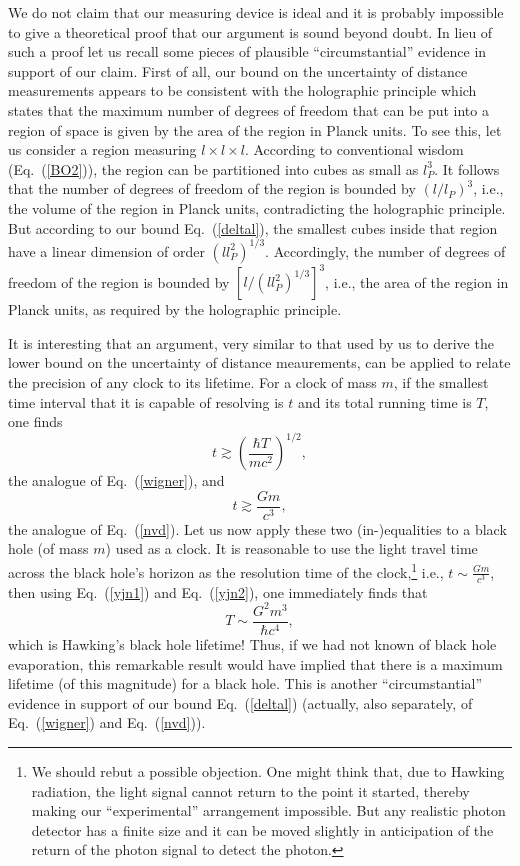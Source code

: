 \documentclass[preprint2]{aastex}
\begin{document}
We do not claim that our measuring device is ideal and it is probably
impossible to give a theoretical proof that our argument is sound beyond
doubt.  In lieu of such a proof let us recall some pieces of
plausible ``circumstantial'' evidence in support of our claim.
First of all, our bound on the
uncertainty of distance measurements appears to be
consistent\citep{ngy00a,ngy00b,ngy01} with the
holographic principle\citep{tho93,sus95} which states that the maximum
number of degrees of freedom that can be put into a region of space is
given by the area of the region in Planck units.  To see this, let us
consider a region measuring $l \times l \times l$.  According
to conventional wisdom (Eq.~(\ref{BO2})), the
region can be partitioned into cubes as small
as $l_P^3$.  It follows that the number of degrees of freedom of the region
is bounded by $(l/l_P)^3$, i.e., the volume of the region in Planck units,
contradicting the holographic principle.  But according to our bound
Eq.~(\ref{deltal}), the smallest cubes inside that region have a linear
dimension of order $(l l_P^2)^{1/3}$.  Accordingly, the number of
degrees of freedom of the region is bounded by $[l/(l l_P^2)^{1/3}]^3$,
i.e., the area of the region in Planck units, as required by the
holographic principle.

It is interesting that an argument, very similar to that used by us to
derive the lower bound on the uncertainty of distance meaurements, can be
applied to relate the precision of any clock to its
lifetime. \citep{ngy01,ngy02}  For a clock
of mass $m$, if the smallest time
interval that it is capable of resolving is $t$ and its total running
time is $T$, one finds
\begin{equation}
t \gtrsim \left(\frac{\hbar T}{mc^2}\right)^{1/2},
\label{yjn1}
\end{equation}
the analogue of Eq.~(\ref{wigner}), and
\begin{equation}
t \gtrsim \frac{Gm}{c^3},
\label{yjn2}
\end{equation}
the analogue of Eq.~(\ref{nvd}).  Let us now apply these two
(in-)equalities to a black hole (of mass $m$) used as a clock.  It is
reasonable to use the light travel time across the black hole's horizon as
the resolution time\citep{bar96,ngy01} of the clock,\footnote{We
should rebut a possible objection.  One might think that, due to Hawking
radiation, the light signal cannot return to the point it started, thereby
making our ``experimental'' arrangement impossible.  But any realistic photon
detector has a finite size and it can be moved slightly in anticipation of
the return of the photon signal to detect the photon.}
i.e., $t \sim \frac{Gm}{c^3}$, then using Eq.~(\ref{yjn1})
and Eq.~(\ref{yjn2}), one immediately
finds that
\begin{equation}
T \sim \frac{G^2 m^3}{\hbar c^4},
\label{yjn3}
\end{equation}
which is Hawking's black hole lifetime!  Thus, if we had not known of black
hole evaporation, this remarkable result would have implied that there is
a maximum lifetime (of this magnitude) for a black hole.  This is another
``circumstantial'' evidence in support of our bound Eq.~(\ref{deltal})
(actually, also separately, of Eq.~(\ref{wigner}) and
Eq.~(\ref{nvd})).
\end{document}
